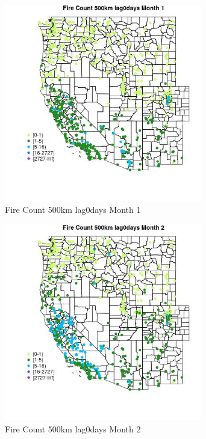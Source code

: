 \begin{figure} 
\centering  
\includegraphics[width=0.77\textwidth]{Code_Outputs/Report_ML_input_PM25_Step4_part_f_de_duplicated_aves_prioritize_24hr_obswNAs_MapObsMo1Fire_Count_500km_lag0days.jpg} 
\caption{\label{fig:Report_ML_input_PM25_Step4_part_f_de_duplicated_aves_prioritize_24hr_obswNAsMapObsMo1Fire_Count_500km_lag0days}Fire Count 500km lag0days Month 1} 
\end{figure} 
 

\clearpage 

\begin{figure} 
\centering  
\includegraphics[width=0.77\textwidth]{Code_Outputs/Report_ML_input_PM25_Step4_part_f_de_duplicated_aves_prioritize_24hr_obswNAs_MapObsMo2Fire_Count_500km_lag0days.jpg} 
\caption{\label{fig:Report_ML_input_PM25_Step4_part_f_de_duplicated_aves_prioritize_24hr_obswNAsMapObsMo2Fire_Count_500km_lag0days}Fire Count 500km lag0days Month 2} 
\end{figure} 
 

